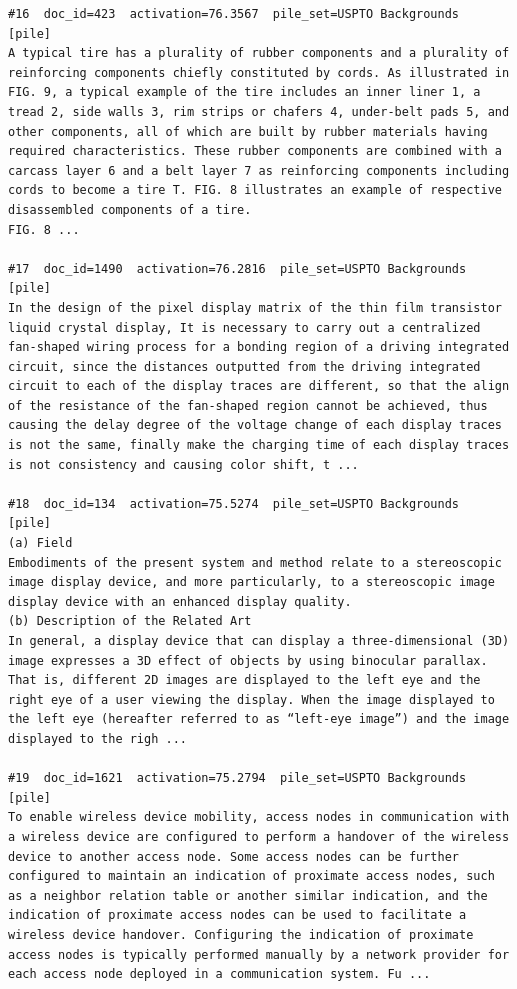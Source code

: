 \begin{verbatim}
#16  doc_id=423  activation=76.3567  pile_set=USPTO Backgrounds  [pile]
A typical tire has a plurality of rubber components and a plurality of reinforcing components chiefly constituted by cords. As illustrated in FIG. 9, a typical example of the tire includes an inner liner 1, a tread 2, side walls 3, rim strips or chafers 4, under-belt pads 5, and other components, all of which are built by rubber materials having required characteristics. These rubber components are combined with a carcass layer 6 and a belt layer 7 as reinforcing components including cords to become a tire T. FIG. 8 illustrates an example of respective disassembled components of a tire.
FIG. 8 ...

#17  doc_id=1490  activation=76.2816  pile_set=USPTO Backgrounds  [pile]
In the design of the pixel display matrix of the thin film transistor liquid crystal display, It is necessary to carry out a centralized fan-shaped wiring process for a bonding region of a driving integrated circuit, since the distances outputted from the driving integrated circuit to each of the display traces are different, so that the align of the resistance of the fan-shaped region cannot be achieved, thus causing the delay degree of the voltage change of each display traces is not the same, finally make the charging time of each display traces is not consistency and causing color shift, t ...

#18  doc_id=134  activation=75.5274  pile_set=USPTO Backgrounds  [pile]
(a) Field
Embodiments of the present system and method relate to a stereoscopic image display device, and more particularly, to a stereoscopic image display device with an enhanced display quality.
(b) Description of the Related Art
In general, a display device that can display a three-dimensional (3D) image expresses a 3D effect of objects by using binocular parallax. That is, different 2D images are displayed to the left eye and the right eye of a user viewing the display. When the image displayed to the left eye (hereafter referred to as “left-eye image”) and the image displayed to the righ ...

#19  doc_id=1621  activation=75.2794  pile_set=USPTO Backgrounds  [pile]
To enable wireless device mobility, access nodes in communication with a wireless device are configured to perform a handover of the wireless device to another access node. Some access nodes can be further configured to maintain an indication of proximate access nodes, such as a neighbor relation table or another similar indication, and the indication of proximate access nodes can be used to facilitate a wireless device handover. Configuring the indication of proximate access nodes is typically performed manually by a network provider for each access node deployed in a communication system. Fu ...


\end{verbatim}
